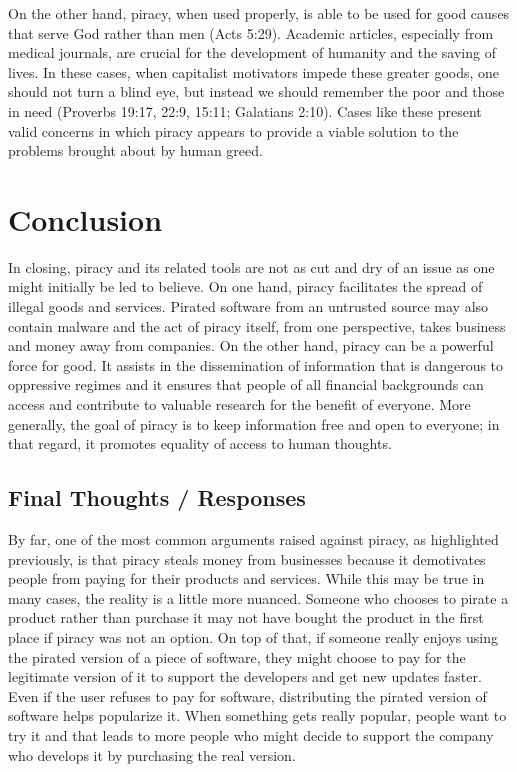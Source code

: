 \documentclass[onecolumn, 12pt]{article}
\begin{document}
On the other hand, piracy, when used properly, is able to be used for good
causes that serve God rather than men (Acts 5:29). Academic articles,
especially from medical journals, are crucial for the development of humanity
and the saving of lives. In these cases, when capitalist motivators impede these
greater goods, one should not turn a blind eye, but instead we should remember
the poor and those in need (Proverbs 19:17, 22:9, 15:11; Galatians 2:10). Cases
like these present valid concerns in which piracy appears to provide a viable
solution to the problems brought about by human greed.

\section{Conclusion}
In closing, piracy and its related tools are not as cut and dry of an issue as one might
initially be led to believe. On one hand, piracy facilitates the spread of illegal goods
and services. Pirated software from an untrusted source may also contain malware and the
act of piracy itself, from one perspective, takes business and money away from companies.
On the other hand, piracy can be a powerful force for good. It assists in the
dissemination of information that is dangerous to oppressive regimes and it ensures that
people of all financial backgrounds can access and contribute to valuable research for the
benefit of everyone. More generally, the goal of piracy is to keep information free and
open to everyone; in that regard, it promotes equality of access to human thoughts. 

\subsection{Final Thoughts / Responses}
By far, one of the most common arguments raised against piracy, as highlighted previously,
is that piracy steals money from businesses because it demotivates people from paying for
their products and services. While this may be true in many cases, the reality is a little
more nuanced. Someone who chooses to pirate a product rather than purchase it may not have
bought the product in the first place if piracy was not an option. On top of that, if
someone really enjoys using the pirated version of a piece of software, they might choose
to pay for the legitimate version of it to support the developers and get new updates
faster. Even if the user refuses to pay for software, distributing the pirated version of
software helps popularize it. When something gets really popular, people want to try it
and that leads to more people who might decide to support the company who develops it by
purchasing the real version.
\end{document}
